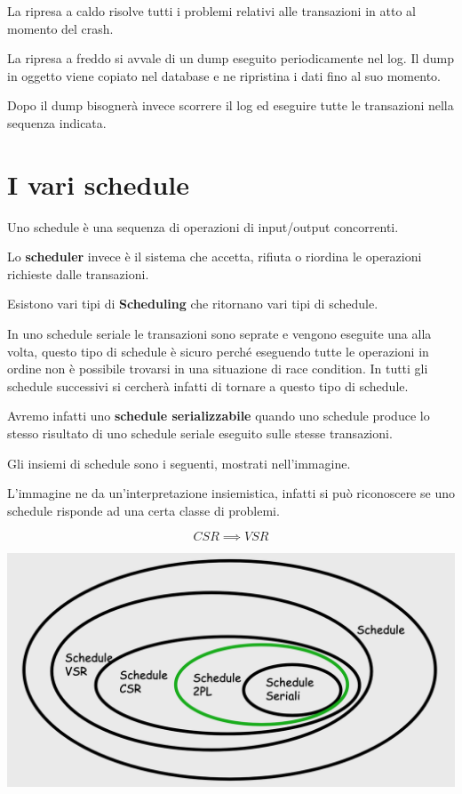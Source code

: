 La ripresa a caldo risolve tutti i problemi relativi alle transazioni in atto al momento del crash.

La ripresa a freddo si avvale di un dump eseguito periodicamente nel log. Il dump in oggetto viene copiato nel database e ne ripristina i dati fino al suo momento.

Dopo il dump bisognerà invece scorrere il log ed eseguire tutte le transazioni nella sequenza indicata.

\section{I vari schedule}

Uno schedule è una sequenza di operazioni di input/output concorrenti.

Lo \textbf{scheduler} invece è il sistema che accetta, rifiuta o riordina le operazioni richieste dalle transazioni.

Esistono vari tipi di \textbf{Scheduling} che ritornano vari tipi di schedule.

In uno schedule seriale le transazioni sono seprate e vengono eseguite una alla volta, questo tipo di schedule è sicuro perché eseguendo tutte le operazioni in ordine non è possibile trovarsi in una situazione di race condition. In tutti gli schedule successivi si cercherà infatti di tornare a questo tipo di schedule.

Avremo infatti uno \textbf{schedule serializzabile} quando uno schedule produce lo stesso risultato di uno schedule seriale eseguito sulle stesse transazioni.

Gli insiemi di schedule sono i seguenti, mostrati nell'immagine.

L'immagine ne da un'interpretazione insiemistica, infatti si può riconoscere se uno schedule risponde ad una certa classe di problemi.

\[CSR \implies VSR\]

\includegraphics[width=\linewidth]{img/schedules.png}

